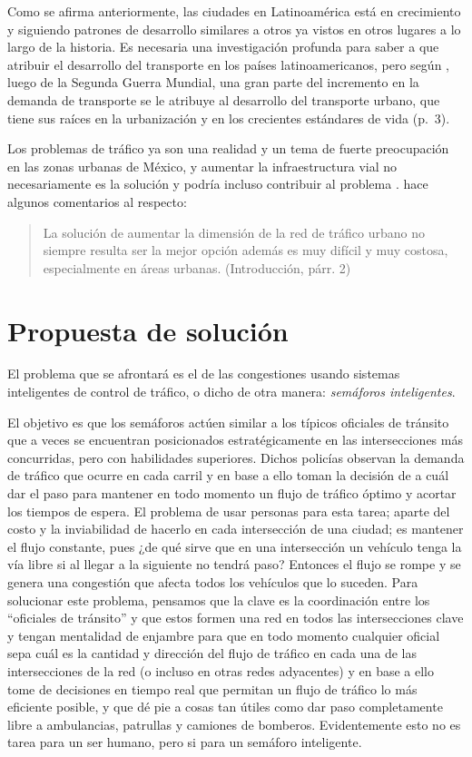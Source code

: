 Como se afirma anteriormente, las ciudades en Latinoamérica está en
crecimiento y siguiendo patrones de desarrollo similares a otros ya
vistos en otros lugares a lo largo de la historia. Es necesaria una
investigación profunda para saber a que atribuir el desarrollo del
transporte en los países latinoamericanos, pero según
\parencite{Patriksson2012}, luego de la Segunda Guerra Mundial, una gran
parte del incremento en la demanda de transporte se le atribuye al
desarrollo del transporte urbano, que tiene sus raíces en la
urbanización y en los crecientes estándares de vida (p.~3).

Los problemas de tráfico ya son una realidad y un tema de fuerte
preocupación en las zonas urbanas de México, y aumentar la
infraestructura vial no necesariamente es la solución y podría incluso
contribuir al problema \parencite[124-126]{Galindo2006}.
\parencite{JoelTrejo2006} hace algunos comentarios al respecto:

\begin{quote}
La solución de aumentar la dimensión de la red de tráfico urbano no
siempre resulta ser la mejor opción además es muy difícil y muy costosa,
especialmente en áreas urbanas. (Introducción, párr. 2)
\end{quote}

\hypertarget{propuesta-de-soluciuxf3n}{%
\section{Propuesta de solución}\label{propuesta-de-soluciuxf3n}}

El problema que se afrontará es el de las congestiones usando sistemas
inteligentes de control de tráfico, o dicho de otra manera:
\emph{semáforos inteligentes}.

El objetivo es que los semáforos actúen similar a los típicos oficiales
de tránsito que a veces se encuentran posicionados estratégicamente en
las intersecciones más concurridas, pero con habilidades superiores.
Dichos policías observan la demanda de tráfico que ocurre en cada carril
y en base a ello toman la decisión de a cuál dar el paso para mantener
en todo momento un flujo de tráfico óptimo y acortar los tiempos de
espera. El problema de usar personas para esta tarea; aparte del costo y
la inviabilidad de hacerlo en cada intersección de una ciudad; es
mantener el flujo constante, pues ¿de qué sirve que en una intersección
un vehículo tenga la vía libre si al llegar a la siguiente no tendrá
paso? Entonces el flujo se rompe y se genera una congestión que afecta
todos los vehículos que lo suceden. Para solucionar este problema,
pensamos que la clave es la coordinación entre los ``oficiales de
tránsito'' y que estos formen una red en todos las intersecciones clave
y tengan mentalidad de enjambre para que en todo momento cualquier
oficial sepa cuál es la cantidad y dirección del flujo de tráfico en
cada una de las intersecciones de la red (o incluso en otras redes
adyacentes) y en base a ello tome de decisiones en tiempo real que
permitan un flujo de tráfico lo más eficiente posible, y que dé pie a
cosas tan útiles como dar paso completamente libre a ambulancias,
patrullas y camiones de bomberos. Evidentemente esto no es tarea para un
ser humano, pero si para un semáforo inteligente.


